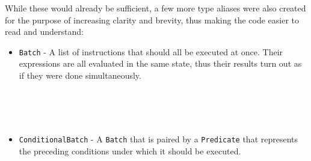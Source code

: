 While these would already be sufficient, a few more type aliases were also created for the purpose of increasing clarity and brevity, thus making the code easier to read and understand:
\begin{itemize}
    
    \item \verb|Batch| - A list of instructions that should all be executed at once. Their expressions are all evaluated in the same state, thus their results turn out as if they were done simultaneously.
    \begin{code}
        \>[2]\AgdaSpace{}%
        \AgdaSymbol{:}\AgdaSpace{}%
        \<%
        \\
        \>[2]\AgdaSpace{}%
        \AgdaSymbol{=}\AgdaSpace{}%
        \AgdaSpace{}%
        \<%
        \\
        \>[2]\AgdaSpace{}%
        \AgdaSymbol{:}\AgdaSpace{}%
        \AgdaSpace{}%
        \AgdaSpace{}%
        \AgdaSpace{}%
        \AgdaSpace{}%
        \<%
        \\
        \>[2]\AgdaSpace{}%
        \AgdaSymbol{=}\AgdaSpace{}%
        \<%
    \end{code}
    
    \item \verb|ConditionalBatch| - A \verb|Batch| that is paired by a \verb|Predicate| that represents the preceding conditions under which it should be executed.
    \begin{code}
        \>[2]\AgdaSpace{}%
        \AgdaSymbol{:}\AgdaSpace{}%
        \<%
        \\
        \>[2]\AgdaSpace{}%
        \AgdaSymbol{=}\AgdaSpace{}%
        \AgdaSymbol{(}\AgdaSpace{}%
        \AgdaSpace{}%
        \AgdaSymbol{)}\<%
    \end{code}
    

\end{itemize}
